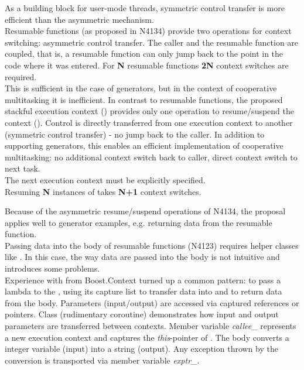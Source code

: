 As a building block for user-mode threads, symmetric control transfer is more
efficient than the asymmetric mechanism.\\
\newline
Resumable functions (as proposed in N4134\cite{N4134}) provide two operations
for context switching: asymmetric control transfer. The caller and the
resumable function are coupled, that is, a resumable function can only jump back
to the point in the code where it was entered.
For {\bfseries{N}} resumable functions {\bfseries{2N}} context switches are
required.\\
\newline
This is sufficient in the case of generators, but in the context of cooperative
multitasking it is inefficient.
In contrast to resumable functions, the proposed stackful execution context
(\ectx) provides only one operation to resume/suspend the context (\ectxop).
Control is directly transferred from one execution context to
another (symmetric control transfer) - no jump back to the caller. In addition
to supporting generators, this enables an efficient implementation of
cooperative multitasking: no additional context switch back to caller,
direct context switch to next task.\\
The next execution context must be explicitly specified.\\
\newline
{}
Resuming {\bfseries{N}} instances of \ectx takes {\bfseries{N+1}} context
switches.

Because of the asymmetric resume/suspend operations of N4134, the proposal
applies well to generator examples, e.g. returning data from the resumable
function.\\
\newline
Passing data into the body of resumable functions (N4123) requires helper
classes like \channel.
In this case, the way data are passed into the body is not intuitive and
introduces some problems.\\
\newline
Experience with  from Boost.Context\cite{bcontext}
turned up a common pattern: to pass a lambda to the ,
using its capture list to transfer data into and to return data from the
body. Parameters (input/output) are accessed via captured references or
pointers.
Class  (rudimentary coroutine) demonstrates how input and output
parameters are transferred between contexts. Member variable
\emph{callee\_} represents a new execution context and captures the
\emph{this}-pointer of . The body converts a integer variable (input)
into a string (output). Any exception thrown by the conversion is transported
via member variable \emph{exptr\_}.

